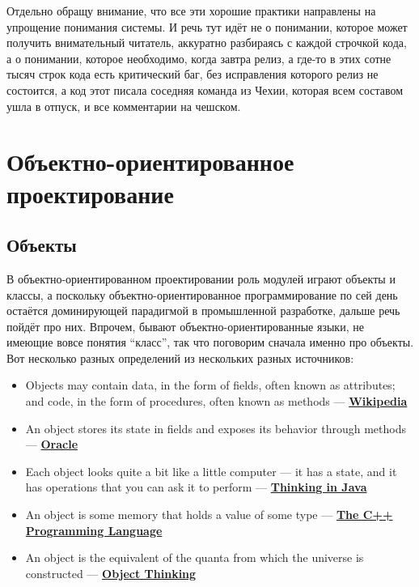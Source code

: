 \documentclass[a5paper]{article}
\begin{document}
Отдельно обращу внимание, что все эти хорошие практики направлены на упрощение понимания системы. И речь тут идёт не о понимании, которое может получить внимательный читатель, аккуратно разбираясь с каждой строчкой кода, а о понимании, которое необходимо, когда завтра релиз, а где-то в этих сотне тысяч строк кода есть критический баг, без исправления которого релиз не состоится, а код этот писала соседняя команда из Чехии, которая всем составом ушла в отпуск, и все комментарии на чешском.

\section{Объектно-ориентированное проектирование}

\subsection{Объекты}

В объектно-ориентированном проектировании роль модулей играют объекты и классы, а поскольку объектно-ориентированное программирование по сей день остаётся доминирующей парадигмой в промышленной разработке, дальше речь пойдёт про них. Впрочем, бывают объектно-ориентированные языки, не имеющие вовсе понятия ``класс'', так что поговорим сначала именно про объекты. Вот несколько разных определений из нескольких разных источников:

\begin{itemize}
	\item Objects may contain data, in the form of fields, often known as attributes; and code, in the form of procedures, often known as methods --- \textbf{\href{https://en.wikipedia.org/wiki/Object-oriented\_programming}{Wikipedia}}
	\item An object stores its state in fields and exposes its behavior through methods --- \textbf{\href{https://docs.oracle.com/javase/tutorial/java/concepts/object.html}{Oracle}}
	\item Each object looks quite a bit like a little computer --- it has a state, and it has operations that you can ask it to perform --- \textbf{\href{http://amzn.to/1PBmQpm}{Thinking in Java}}
	\item An object is some memory that holds a value of some type --- \textbf{\href{http://amzn.to/1XyGCtk}{The C++ Programming Language}}
	\item An object is the equivalent of the quanta from which the universe is constructed --- \textbf{\href{http://amzn.to/266oJr4}{Object Thinking}}
\end{itemize}
\end{document}
